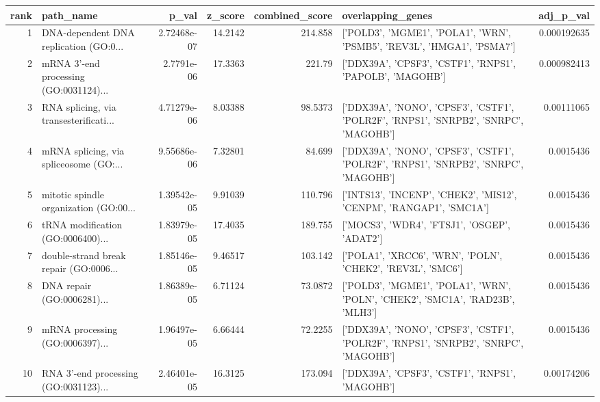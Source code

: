\documentclass{article}
\begin{document}
\begin{table}[h]
\centering
\begin{tabular}{rlrrrlr}
\hline
   rank & path\_name                              &       p\_val &   z\_score &   combined\_score & overlapping\_genes                                                                    &   adj\_p\_val \\
\hline
      1 & DNA-dependent DNA replication (GO:0... & 2.72468e-07 &  14.2142  &         214.858  & ['POLD3', 'MGME1', 'POLA1', 'WRN', 'PSMB5', 'REV3L', 'HMGA1', 'PSMA7']               & 0.000192635 \\
      2 & mRNA 3'-end processing (GO:0031124)... & 2.7791e-06  &  17.3363  &         221.79   & ['DDX39A', 'CPSF3', 'CSTF1', 'RNPS1', 'PAPOLB', 'MAGOHB']                            & 0.000982413 \\
      3 & RNA splicing, via transesterificati... & 4.71279e-06 &   8.03388 &          98.5373 & ['DDX39A', 'NONO', 'CPSF3', 'CSTF1', 'POLR2F', 'RNPS1', 'SNRPB2', 'SNRPC', 'MAGOHB'] & 0.00111065  \\
      4 & mRNA splicing, via spliceosome (GO:... & 9.55686e-06 &   7.32801 &          84.699  & ['DDX39A', 'NONO', 'CPSF3', 'CSTF1', 'POLR2F', 'RNPS1', 'SNRPB2', 'SNRPC', 'MAGOHB'] & 0.0015436   \\
      5 & mitotic spindle organization (GO:00... & 1.39542e-05 &   9.91039 &         110.796  & ['INTS13', 'INCENP', 'CHEK2', 'MIS12', 'CENPM', 'RANGAP1', 'SMC1A']                  & 0.0015436   \\
      6 & tRNA modification (GO:0006400)...      & 1.83979e-05 &  17.4035  &         189.755  & ['MOCS3', 'WDR4', 'FTSJ1', 'OSGEP', 'ADAT2']                                         & 0.0015436   \\
      7 & double-strand break repair (GO:0006... & 1.85146e-05 &   9.46517 &         103.142  & ['POLA1', 'XRCC6', 'WRN', 'POLN', 'CHEK2', 'REV3L', 'SMC6']                          & 0.0015436   \\
      8 & DNA repair (GO:0006281)...             & 1.86389e-05 &   6.71124 &          73.0872 & ['POLD3', 'MGME1', 'POLA1', 'WRN', 'POLN', 'CHEK2', 'SMC1A', 'RAD23B', 'MLH3']       & 0.0015436   \\
      9 & mRNA processing (GO:0006397)...        & 1.96497e-05 &   6.66444 &          72.2255 & ['DDX39A', 'NONO', 'CPSF3', 'CSTF1', 'POLR2F', 'RNPS1', 'SNRPB2', 'SNRPC', 'MAGOHB'] & 0.0015436   \\
     10 & RNA 3'-end processing (GO:0031123)...  & 2.46401e-05 &  16.3125  &         173.094  & ['DDX39A', 'CPSF3', 'CSTF1', 'RNPS1', 'MAGOHB']                                      & 0.00174206  \\

\end{tabular}
\end{table}
\end{document}
